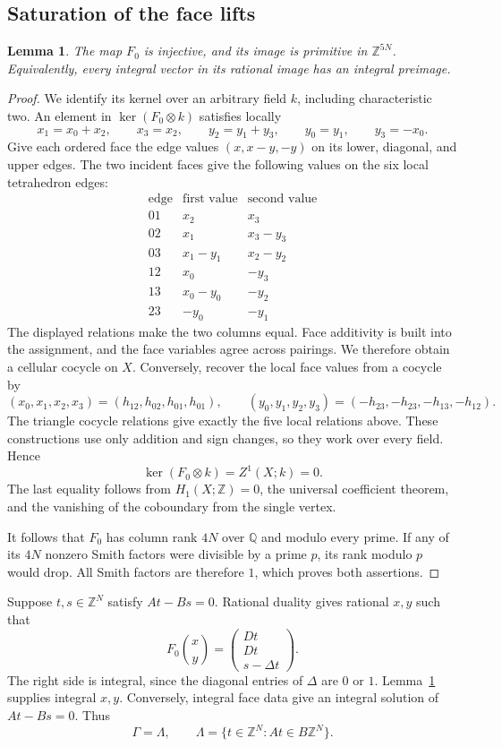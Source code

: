 \documentclass[11pt]{article}
\newtheorem{lemma}[theorem]{Lemma}
\theoremstyle{definition}\newtheorem{definition}[theorem]{Definition}
\theoremstyle{remark}\newtheorem{remark}[theorem]{Remark}
\newcommand{\Z}{\mathbb Z}
\newcommand{\Q}{\mathbb Q}
\begin{document}
\subsection{Saturation of the face lifts}

\begin{lemma}\label{lem:primitive-lifts}
The map $F_0$ is injective, and its image is primitive in $\Z^{5N}$.
Equivalently, every integral vector in its rational image has an integral
preimage.
\end{lemma}
\begin{proof}
We identify its kernel over an arbitrary field $k$, including characteristic
two. An element in $\ker(F_0\otimes k)$ satisfies locally
\[
 x_1=x_0+x_2,\qquad x_3=x_2,\qquad
 y_2=y_1+y_3,\qquad y_0=y_1,\qquad y_3=-x_0.
\]
Give each ordered face the edge values $(x,x-y,-y)$ on its lower,
diagonal, and upper edges. The two incident faces give the following
values on the six local tetrahedron edges:
\[
\begin{array}{c|cc}
 \text{edge}&\text{first value}&\text{second value}\\\hline
 01&x_2&x_3\\
 02&x_1&x_3-y_3\\
 03&x_1-y_1&x_2-y_2\\
 12&x_0&-y_3\\
 13&x_0-y_0&-y_2\\
 23&-y_0&-y_1
\end{array}
\]
The displayed relations make the two columns equal. Face additivity is
built into the assignment, and the face variables agree across pairings.
We therefore obtain a cellular cocycle on $X$. Conversely, recover the
local face values from a cocycle by
\[
 (x_0,x_1,x_2,x_3)=(h_{12},h_{02},h_{01},h_{01}),\qquad
 (y_0,y_1,y_2,y_3)=(-h_{23},-h_{23},-h_{13},-h_{12}).
\]
The triangle cocycle relations give exactly the five local relations
above. These constructions use only addition and sign changes, so they
work over every field. Hence
\[
 \ker(F_0\otimes k)=Z^1(X;k)=0.
\]
The last equality follows from $H_1(X;\Z)=0$, the universal coefficient
theorem, and the vanishing of the coboundary from the single vertex.

It follows that $F_0$ has column rank $4N$ over $\Q$ and modulo every
prime. If any of its $4N$ nonzero Smith factors were divisible by a
prime $p$, its rank modulo $p$ would drop. All Smith factors are
therefore $1$, which proves both assertions.
\end{proof}

Suppose $t,s\in\Z^N$ satisfy $At-Bs=0$. Rational duality gives rational
$x,y$ such that
\[
 F_0\binom{x}{y}
 =\begin{pmatrix}Dt\\Dt\\s-\Delta t\end{pmatrix}.
\]
The right side is integral, since the diagonal entries of $\Delta$ are
$0$ or $1$. Lemma~\ref{lem:primitive-lifts} supplies integral $x,y$.
Conversely, integral face data give an integral solution of $At-Bs=0$.
Thus
\begin{equation}
 \Gamma=\Lambda,\qquad
 \Lambda=\{t\in\Z^N:At\in B\Z^N\}.
 \label{eq:latticeeq}
\end{equation}
\end{document}
